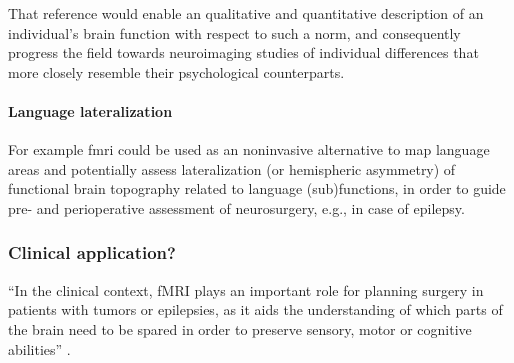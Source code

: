 

%
That reference would enable an qualitative and quantitative description of an
individual's brain function with respect to such a norm, and consequently
progress the field towards neuroimaging studies of individual differences that
more closely resemble their psychological counterparts.


\paragraph{Language lateralization}


%
For example \ac{fmri} could be used as an noninvasive alternative to map
language areas and potentially assess lateralization (or hemispheric asymmetry)
of functional brain topography related to language (sub)functions, in order to
guide pre- and perioperative assessment of neurosurgery, e.g., in case of
epilepsy.



\subsubsection{Clinical application?}




``In the clinical context, fMRI plays an important role for planning surgery in
patients with tumors or epilepsies, as it aids the understanding of which parts
of the brain need to be spared in order to preserve sensory, motor or cognitive
abilities'' \citep{wegrzyn2018thought}.



